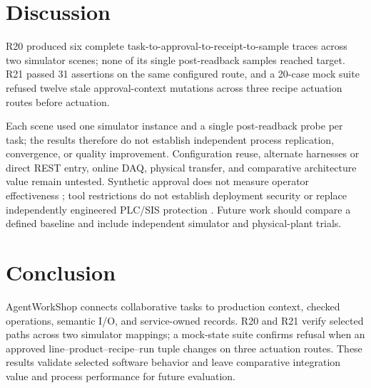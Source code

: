 \section{Discussion}
\label{sec:limits}
R20 produced six complete task-to-approval-to-receipt-to-sample traces across
two simulator scenes; none of its single post-readback samples reached target.
R21 passed 31 assertions on the same configured route, and a 20-case mock
suite refused twelve stale approval-context mutations across three recipe
actuation routes before actuation.

Each scene used one simulator instance and a single post-readback probe per
task; the results therefore do not establish independent process replication,
convergence, or quality improvement. Configuration reuse, alternate harnesses
or direct REST entry, online DAQ, physical transfer, and comparative
architecture value remain untested. Synthetic approval does not measure
operator effectiveness
\cite{parasuramanmanzey2010complacency,parasuraman2000model,bainbridge1983ironies};
tool restrictions do not establish deployment security
\cite{greshake2023injection,liu2024pinjection,iec62443-3-3} or replace
independently engineered PLC/SIS protection \cite{iec61511}. Future work
should compare a defined baseline and include independent simulator and
physical-plant trials.

\section{Conclusion}
\label{sec:conclusion}
AgentWorkShop connects collaborative tasks to production context, checked
operations, semantic I/O, and service-owned records. R20 and R21 verify
selected paths across two simulator mappings; a mock-state suite confirms
refusal when an approved line--product--recipe--run tuple changes on three
actuation routes. These results validate selected software behavior and leave
comparative integration value and process performance for future evaluation.

